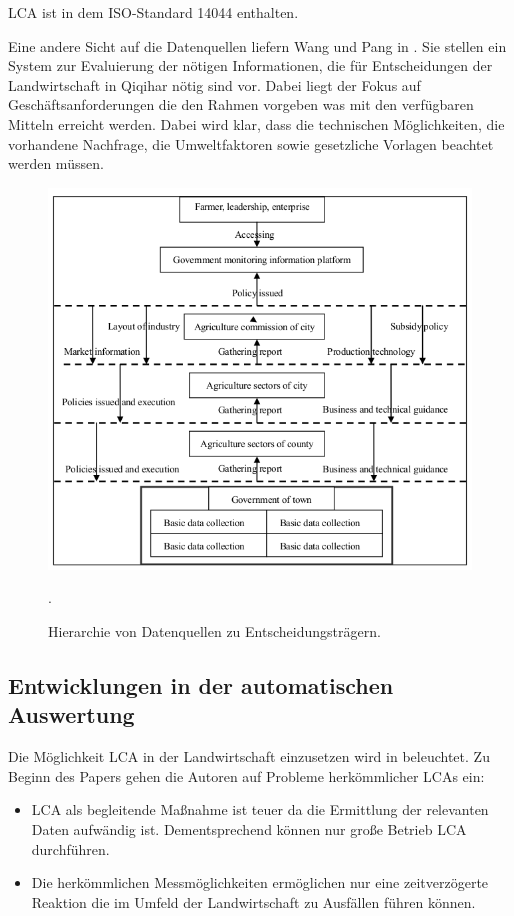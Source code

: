 LCA ist in dem ISO-Standard 14044 enthalten.\cite{jour:Klopffer1997}

Eine andere Sicht auf die Datenquellen liefern Wang und Pang in \cite{jour:Wang2013}. Sie stellen ein System zur Evaluierung der nötigen Informationen, die für Entscheidungen der Landwirtschaft in Qiqihar nötig sind vor. Dabei liegt der Fokus auf Geschäftsanforderungen die den Rahmen vorgeben was mit den verfügbaren Mitteln erreicht werden. Dabei wird klar, dass die technischen Möglichkeiten, die vorhandene Nachfrage, die Umweltfaktoren sowie gesetzliche Vorlagen beachtet werden müssen.

\begin{figure}[h]
 \includegraphics[scale=0.6,natwidth=\textwidth]{figures/designtools/businessrequirements.png}
 \centering
 \label{fig:fmishierarchy}
 \caption{Hierarchie von Datenquellen zu Entscheidungsträgern. \cite{jour:Wang2013}}.
\end{figure}

\subsection{Entwicklungen in der automatischen Auswertung}
Die Möglichkeit LCA in der Landwirtschaft einzusetzen wird in \cite{jour:Bellon-Maurel2014} beleuchtet. Zu Beginn des Papers gehen die Autoren auf Probleme herkömmlicher LCAs ein:
\begin{itemize}
	\item LCA als begleitende Maßnahme ist teuer da die Ermittlung der relevanten Daten aufwändig ist. Dementsprechend können nur große Betrieb LCA durchführen.
	\item Die herkömmlichen Messmöglichkeiten ermöglichen nur eine zeitverzögerte Reaktion die im Umfeld der Landwirtschaft zu Ausfällen führen können.
\end{itemize}

